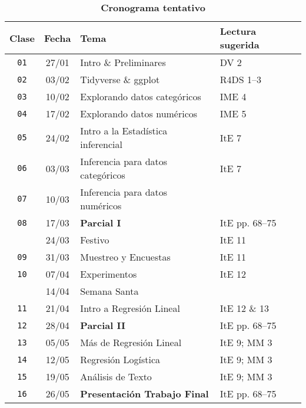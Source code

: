 \documentclass[10pt]{article}
\newcommand{\ra}[1]{\renewcommand{\arraystretch}{#1}}
\begin{document}
	\begin{table}[htb]
		\centering
		\caption*{\textbf{Cronograma tentativo}}
		\ra{1.5}
		\begin{tabular}{@{\extracolsep{1cm}} c c l l @{}}
			\toprule
			\textbf{Clase} & \textbf{Fecha} & \textbf{Tema} & \textbf{Lectura sugerida}  \\ \toprule
			\texttt{01} & 27/01 & Intro \& Preliminares & DV 2 \\
			\texttt{02} & 03/02 & Tidyverse \& ggplot & R4DS 1--3 \\
			\texttt{03} & 10/02 & Explorando datos categóricos & IME 4 \\
			\texttt{04} & 17/02 & Explorando datos numéricos & IME 5
			
			
			
			
			
			
			
			
			
			\\
			\texttt{05} & 24/02 & Intro a la Estadística inferencial & ItE 7 \\
			\texttt{06} & 03/03 & Inferencia para datos categóricos & ItE 7 \\
			\texttt{07} & 10/03 & Inferencia para datos numéricos \\ \midrule
			\texttt{08} & 17/03 & \textbf{Parcial I} & ItE pp. 68--75  \\ \midrule
			& 24/03 & Festivo & ItE 11  \\
			\texttt{09} & 31/03 & Muestreo y Encuestas & ItE 11  \\
			\texttt{10} & 07/04 & Experimentos & ItE 12 \\ 
			& 14/04 & Semana Santa & \\ 
			\texttt{11} & 21/04 & Intro a Regresión Lineal & ItE 12 \& 13 \\ \midrule
			\texttt{12} & 28/04 & \textbf{Parcial II} & ItE pp. 68--75  \\ \midrule
			\texttt{13} & 05/05 & Más de Regresión Lineal & ItE 9; MM 3 \\
			\texttt{14} & 12/05 & Regresión Logística & ItE 9; MM 3 \\
			\texttt{15} & 19/05 & Análisis de Texto & ItE 9; MM 3 \\
			\texttt{16} & 26/05 & \textbf{Presentación Trabajo Final} & ItE pp. 68--75  \\ 
			\bottomrule
		\end{tabular}
	\end{table}
	
	
\end{document}
